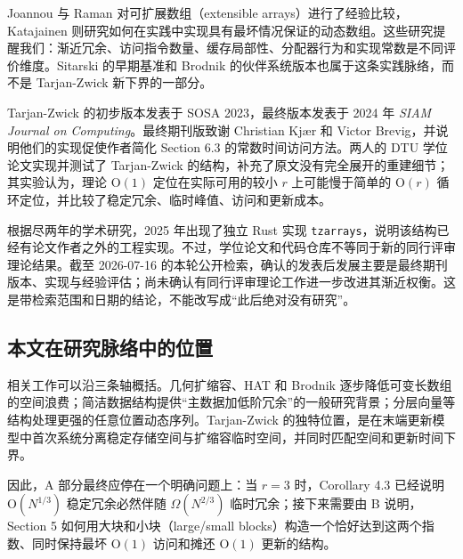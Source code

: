 \documentclass[UTF8,11pt,a4paper]{ctexart}
\begin{document}
Joannou 与 Raman 对可扩展数组（extensible arrays）进行了经验比较，Katajainen 则研究如何在实践中实现具有最坏情况保证的动态数组。这些研究提醒我们：渐近冗余、访问指令数量、缓存局部性、分配器行为和实现常数是不同评价维度。Sitarski 的早期基准和 Brodnik 的伙伴系统版本也属于这条实践脉络，而不是 Tarjan-Zwick 新下界的一部分。\par

Tarjan-Zwick 的初步版本发表于 SOSA 2023，最终版本发表于 2024 年 \emph{SIAM Journal on Computing}。最终期刊版致谢 Christian Kjær 和 Victor Brevig，并说明他们的实现促使作者简化 Section 6.3 的常数时间访问方法。两人的 DTU 学位论文实现并测试了 Tarjan-Zwick 的结构，补充了原文没有完全展开的重建细节；其实验认为，理论 $\mathrm{O}(1)$ 定位在实际可用的较小 $r$ 上可能慢于简单的 $\mathrm{O}(r)$ 循环定位，并比较了稳定冗余、临时峰值、访问和更新成本。\par

根据尽两年的学术研究，2025 年出现了独立 Rust 实现 \textnormal{\texttt{tzarrays}}，说明该结构已经有论文作者之外的工程实现。不过，学位论文和代码仓库不等同于新的同行评审理论结果。截至 2026-07-16 的本轮公开检索，确认的发表后发展主要是最终期刊版本、实现与经验评估；尚未确认有同行评审理论工作进一步改进其渐近权衡。这是带检索范围和日期的结论，不能改写成“此后绝对没有研究”。\par

\subsection{本文在研究脉络中的位置}

相关工作可以沿三条轴概括。几何扩缩容、HAT 和 Brodnik 逐步降低可变长数组的空间浪费；简洁数据结构提供“主数据加低阶冗余”的一般研究背景；分层向量等结构处理更强的任意位置动态序列。Tarjan-Zwick 的独特位置，是在末端更新模型中首次系统分离稳定存储空间与扩缩容临时空间，并同时匹配空间和更新时间下界。\par

因此，A 部分最终应停在一个明确问题上：当 $r=3$ 时，Corollary 4.3 已经说明 $\mathrm{O}(N^{1/3})$ 稳定冗余必然伴随 $\Omega(N^{2/3})$ 临时冗余；接下来需要由 B 说明，Section 5 如何用大块和小块（large/small blocks）构造一个恰好达到这两个指数、同时保持最坏 $\mathrm{O}(1)$ 访问和摊还 $\mathrm{O}(1)$ 更新的结构。\par
\end{document}
